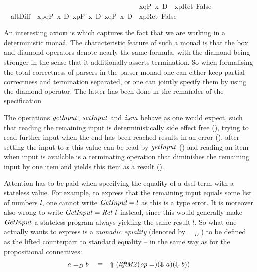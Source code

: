 \begin{isabellebody}
\ \ \ \ \ \ \ \ \ \ \ \ \ \ \ \ \ \ \ \ \ \ \ \ \ \ \ \ \ \ \ \ \ \ \ \ \ {\isacharparenleft}\ {\isacharbrackleft}{\isacharhash}\ x{\isasymleftarrow}q{\isacharbrackright}{\isacharparenleft}P\ x{\isacharparenright}\ {\isasymand}\isactrlsub D\ {\isacharbrackleft}{\isacharhash}\ x{\isasymleftarrow}p{\isacharbrackright}{\isacharparenleft}Ret\ False{\isacharparenright}\ {\isacharparenright}{\isachardoublequote}\isanewline
\ \ altD{\isacharunderscore}iff{\isacharcolon}\ {\isachardoublequote}{\isasymturnstile}\ {\isasymlangle}x{\isasymleftarrow}p{\isasymparallel}q{\isasymrangle}{\isacharparenleft}P\ x{\isacharparenright}\ {\isasymlongleftrightarrow}\isactrlsub D\ {\isasymlangle}x{\isasymleftarrow}p{\isasymrangle}{\isacharparenleft}P\ x{\isacharparenright}\ {\isasymor}\isactrlsub D\ {\isacharparenleft}{\isasymlangle}x{\isasymleftarrow}q{\isasymrangle}{\isacharparenleft}P\ x{\isacharparenright}\ {\isasymand}\isactrlsub D\ {\isacharbrackleft}{\isacharhash}\ x{\isasymleftarrow}p{\isacharbrackright}{\isacharparenleft}Ret\ False{\isacharparenright}{\isacharparenright}{\isachardoublequote}
\isamarkupfalse\isanewline
\end{isabellebody}

An interesting axiom is  which captures the fact that we are
working in a deterministic monad. The characteristic feature of such a monad is
that the box and diamond operators denote nearly the same formula, with the
diamond being stronger in the sense that it additionally asserts termination. So
when formalising the total correctness of parsers in the parser monad one can
either keep partial correctness and termination separated, or one can jointly
specify them by using the diamond operator.  The latter has been done in the
remainder of the specification

The operations $\mathit{getInput}$, $\mathit{setInput}$ and $\mathit{item}$
behave as one would expect, such that reading the remaining input 
is deterministically side effect free (), trying to read
further input when the end has been reached results in an error
(), after setting the input to $x$ this value can be read by
$\mathit{getInput}$ () and reading an item when input is available is
a terminating operation that diminishes the remaining input by one item and
yields this item as a result ().
\begin{rem} \label{rem:monadic-equality} Attention has to be paid when
  specifying the equality of a dsef term with a stateless value.  For example,
  to express that the remaining input equals some list of numbers $l$, one
  cannot write $\mathit{GetInput} = l$ as this is a type error. It is moreover also
  wrong to write $\mathit{GetInput} = \mathit{Ret}~l$ instead, since this would generally
  make $\mathit{GetInput}$ a stateless program always yielding the same result $l$.
  So what one actually wants to express is a \emph{monadic equality} (denoted by
  $=_D$) to be defined as the lifted counterpart to standard equality -- in
  the same way as for the propositional connectives:
  \[
  a =_D b \quad\equiv\quad \Uparrow (\mathit{liftM2} (\mathit{op} =) ( \Downarrow a) (\Downarrow b))
  \]
\end{rem}

